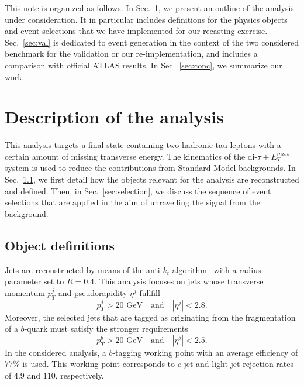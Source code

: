 \documentclass{ws-mpla}
\begin{document}
This note is organized as follows. In Sec.~\ref{sec:descript}, we present an outline of the analysis under consideration. It in particular includes definitions for the physics objects and event selections that we have implemented for our recasting exercise. Sec.~\ref{sec:val} is dedicated to event generation in the context of the two considered benchmark for the validation or our re-implementation, and includes a comparison with official ATLAS results. In Sec.~\ref{sec:conc}, we summarize our work.

\section{Description of the analysis}\label{sec:descript}

This analysis targets a final state containing two hadronic tau leptons with a certain amount of missing transverse energy. 
The kinematics of the di-$\tau +E^{miss}_T$ system is used to reduce the contributions from Standard Model backgrounds. 
In Sec.~\ref{sec:obj}, we first detail how the objects relevant for the analysis are reconstructed and defined. Then, in Sec.~\ref{sec:selection}, we discuss the sequence of event selections that are applied in the aim of unravelling the signal from the background.

\subsection{Object definitions}\label{sec:obj}

Jets are reconstructed by means of the anti-$k_t$ algorithm~\cite{Cacciari:2008gp} with a radius parameter set to $R=0.4$. This analysis focuses on jets whose transverse momentum $p^j_T$ and pseudorapidity $\eta^j$ fullfill
\begin{equation}
p^j_T > 20 \textrm{ GeV}\quad \textrm{and}\quad |\eta^j| < 2.8.
\end{equation} 
Moreover, the selected jets that are tagged as originating from the fragmentation of a $b$-quark must satisfy the stronger requirements
\begin{equation}
p^b_T > 20 \textrm{ GeV}\quad \textrm{and}\quad |\eta^b| < 2.5.
\end{equation}
In the considered analysis, a $b$-tagging working point with an average efficiency of $77\%$ is used. This working point corresponds to $c$-jet and light-jet rejection rates of $4.9$ and $110$, respectively.
\end{document}
